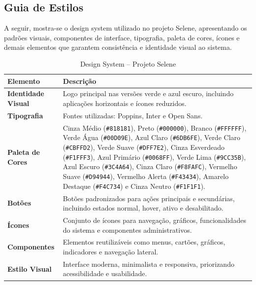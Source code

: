\documentclass[11pt,a4paper]{article}
\begin{document}
\subsection{Guia de Estilos}

A seguir, mostra-se o design system utilizado no projeto Selene, apresentando os padrões visuais, componentes de interface, tipografia, paleta de cores, ícones e demais elementos que garantem consistência e identidade visual ao sistema.

\begin{table}[H]
\centering
\caption{Design System -- Projeto Selene}
\label{tab:designsystem}
\renewcommand{\arraystretch}{1.3}
\small

\begin{tabular}{|p{3.5cm}|p{9.5cm}|}
\hline
\textbf{Elemento} & \textbf{Descrição} \\
\hline

\textbf{Identidade Visual} &
Logo principal nas versões verde e azul escuro, incluindo aplicações horizontais e ícones reduzidos. \\
\hline

\textbf{Tipografia} &
Fontes utilizadas: Poppins, Inter e Open Sans. \\
\hline

\textbf{Paleta de Cores} &
Cinza Médio (\texttt{\#818181}), 
Preto (\texttt{\#000000}), 
Branco (\texttt{\#FFFFFF}), 
Verde Água (\texttt{\#00D09E}), 
Azul Claro (\texttt{\#6DB6FE}), 
Verde Claro (\texttt{\#CBFFD2}), 
Verde Suave (\texttt{\#DFF7E2}), 
Cinza Esverdeado (\texttt{\#F1FFF3}), 
Azul Primário (\texttt{\#0068FF}), 
Verde Lima (\texttt{\#9CC35B}), 
Azul Escuro (\texttt{\#3C4A64}), 
Cinza Claro (\texttt{\#F8FAFC}), 
Vermelho Suave (\texttt{\#D94944}), 
Vermelho Alerta (\texttt{\#F43434}), 
Amarelo Destaque (\texttt{\#F4C734}) e 
Cinza Neutro (\texttt{\#F1F1F1}). \\
\hline

\textbf{Botões} &
Botões padronizados para ações principais e secundárias, incluindo estados normal, hover, ativo e desabilitado. \\
\hline

\textbf{Ícones} &
Conjunto de ícones para navegação, gráficos, funcionalidades do sistema e componentes administrativos. \\
\hline

\textbf{Componentes} &
Elementos reutilizáveis como menus, cartões, gráficos, indicadores e navegação lateral. \\
\hline

\textbf{Estilo Visual} &
Interface moderna, minimalista e responsiva, priorizando acessibilidade e usabilidade. \\
\hline

\end{tabular}
\end{table}
\end{document}
